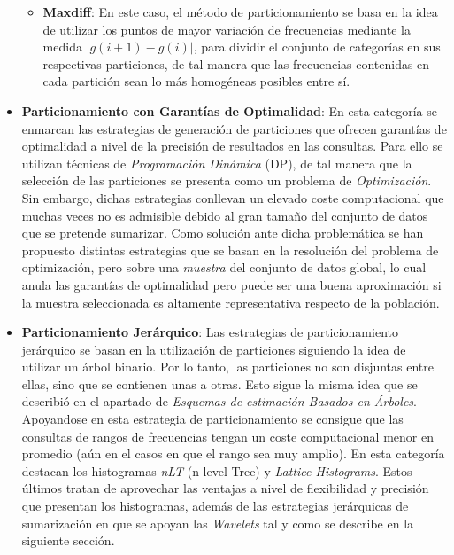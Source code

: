\documentclass{subfiles}
\begin{document}
\begin{itemize}
\begin{itemize}
              \item \textbf{Maxdiff}: En este caso, el método de particionamiento se basa en la idea de utilizar los puntos de mayor variación de frecuencias mediante la medida $|g(i+1) - g(i)|$, para dividir el conjunto de categorías en sus respectivas particiones, de tal manera que las frecuencias contenidas en cada partición sean lo más homogéneas posibles entre sí.

            \end{itemize}
          \item \textbf{Particionamiento con Garantías de Optimalidad}: En esta categoría se enmarcan las estrategias de generación de particiones que ofrecen garantías de optimalidad a nivel de la precisión de resultados en las consultas. Para ello se utilizan técnicas de \emph{Programación Dinámica} (DP), de tal manera que la selección de las particiones se presenta como un problema de \emph{Optimización}. Sin embargo, dichas estrategias conllevan un elevado coste computacional que muchas veces no es admisible debido al gran tamaño del conjunto de datos que se pretende sumarizar. Como solución ante dicha problemática se han propuesto distintas estrategias que se basan en la resolución del problema de optimización, pero sobre una \emph{muestra} del conjunto de datos global, lo cual anula las garantías de optimalidad pero puede ser una buena aproximación si la muestra seleccionada es altamente representativa respecto de la población.

          \item \textbf{Particionamiento Jerárquico}: Las estrategias de particionamiento jerárquico se basan en la utilización de particiones siguiendo la idea de utilizar un árbol binario. Por lo tanto, las particiones no son disjuntas entre ellas, sino que se contienen unas a otras. Esto sigue la misma idea que se describió en el apartado de \emph{Esquemas de estimación Basados en Árboles}. Apoyandose en esta estrategia de particionamiento se consigue que las consultas de rangos de frecuencias tengan un coste computacional menor en promedio (aún en el casos en que el rango sea muy amplio). En esta categoría destacan los histogramas \emph{nLT} (n-level Tree) y \emph{Lattice Histograms}. Estos últimos tratan de aprovechar las ventajas a nivel de flexibilidad y precisión que presentan los histogramas, además de las estrategias jerárquicas de sumarización en que se apoyan las \emph{Wavelets} tal y como se describe en la siguiente sección.

        \end{itemize}
\end{document}
